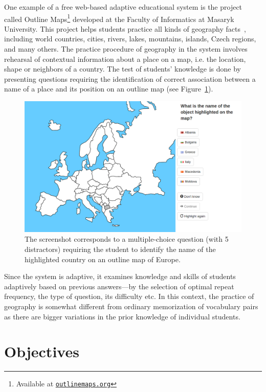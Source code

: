 One example of a free web-based adaptive educational system is the project called Outline Maps\footnote{Available at \href{http://outlinemaps.org}{\texttt{outlinemaps.org}}} developed at the Faculty of Informatics at Masaryk University. This project helps students practice all kinds of geography facts~\cite{Papousek2014}, including world countries, cities, rivers, lakes, mountains, islands, Czech regions, and many others. The practice procedure of geography in the system involves rehearsal of contextual information about a place on a map, i.e. the location, shape or neighbors of a country. The test of students' knowledge is done by presenting questions requiring the identification of correct association between a name of a place and its position on an outline map (see Figure~\ref{fig:slepemapy}).

\begin{figure}[htbp]
  \centering
  \includegraphics[width=\textwidth]{img/slepemapy}
  \caption{The screenshot corresponds to a multiple-choice question (with 5 distractors) requiring the student to identify the name of the highlighted country on an outline map of Europe.}
  \label{fig:slepemapy}
\end{figure}

Since the system is adaptive, it examines knowledge and skills of students adaptively based on previous answers---by the selection of optimal repeat frequency, the type of question, its difficulty etc. In this context, the practice of geography is somewhat different from ordinary memorization of vocabulary pairs as there are bigger variations in the prior knowledge of individual students.

\section{Objectives}

